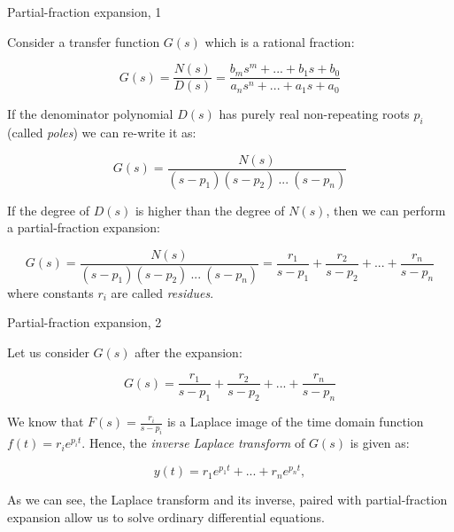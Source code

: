 \documentclass{beamer}
\begin{document}
\begin{frame}{Partial-fraction expansion, 1}
	\begin{flushleft}
		
		Consider a transfer function $G(s)$ which is a rational fraction:
		
		\begin{equation}
			G(s) = \frac{N(s)}{D(s)} = \frac{b_m s^m + ... + b_1 s + b_0}{a_n s^n + ... + a_1 s + a_0}
		\end{equation}		
		
		If the denominator polynomial $D(s)$ has purely real non-repeating roots $p_i$ (called \emph{poles}) we can re-write it as:
		
		\begin{equation}
			G(s) = \frac{N(s)}{(s - p_1)(s - p_2) \ ... \ (s - p_n)}
		\end{equation}		
		
		
		If the degree of $D(s)$ is higher than the degree of $N(s)$, then we can perform a partial-fraction expansion:
		
		\begin{equation*}
			G(s) = \frac{N(s)}{(s - p_1)(s - p_2) \ ... \ (s - p_n)} = \frac{r_1}{s - p_1} + \frac{r_2}{s - p_2} + ... + \frac{r_n}{s - p_n}
		\end{equation*}		
		where constants $r_i$ are called \emph{residues}.
		
	\end{flushleft}
\end{frame}




\begin{frame}{Partial-fraction expansion, 2}
	\begin{flushleft}
		
		Let us consider $G(s)$ after the expansion:
		
		\begin{equation*}
			G(s) =\frac{r_1}{s - p_1} + \frac{r_2}{s - p_2} + ... + \frac{r_n}{s - p_n}
		\end{equation*}		
		
		We know that $F(s) = \frac{r_i}{s - p_i} $ is a Laplace image of the time domain function $f(t) = r_i e^{p_i t}$. Hence, the \emph{inverse Laplace transform} of $G(s)$ is given as:
		
		\begin{equation*}
			y(t) =r_1 e^{p_1 t} + ... + r_n e^{p_n t},
		\end{equation*}		
		
		As we can see, the Laplace transform and its inverse, paired with partial-fraction expansion allow us to solve ordinary differential equations.
		
	\end{flushleft}
\end{frame}
\end{document}
